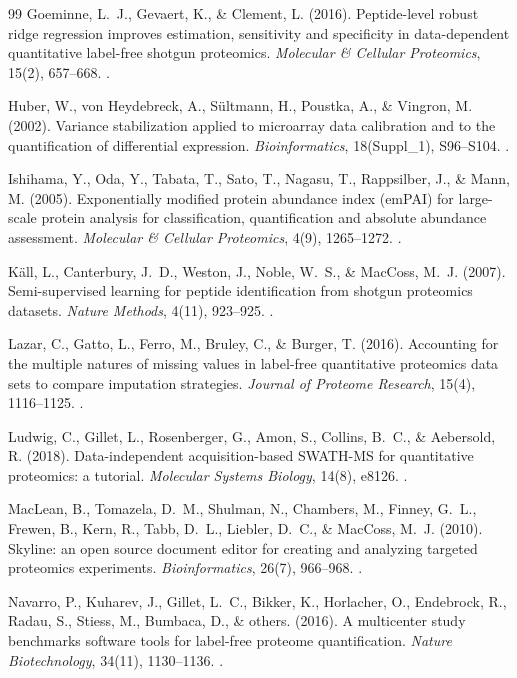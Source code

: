\documentclass[11pt,oneside]{book}
\begin{document}
\begin{thebibliography}{99}
Goeminne, L.~J., Gevaert, K., \& Clement, L. (2016). Peptide-level robust ridge regression improves estimation, sensitivity and specificity in data-dependent quantitative label-free shotgun proteomics. \textit{Molecular \& Cellular Proteomics}, 15(2), 657--668. .

Huber, W., von Heydebreck, A., S{\"u}ltmann, H., Poustka, A., \& Vingron, M. (2002). Variance stabilization applied to microarray data calibration and to the quantification of differential expression. \textit{Bioinformatics}, 18(Suppl\_1), S96--S104. .

Ishihama, Y., Oda, Y., Tabata, T., Sato, T., Nagasu, T., Rappsilber, J., \& Mann, M. (2005). Exponentially modified protein abundance index (emPAI) for large-scale protein analysis for classification, quantification and absolute abundance assessment. \textit{Molecular \& Cellular Proteomics}, 4(9), 1265--1272. .

K{\"a}ll, L., Canterbury, J.~D., Weston, J., Noble, W.~S., \& MacCoss, M.~J. (2007). Semi-supervised learning for peptide identification from shotgun proteomics datasets. \textit{Nature Methods}, 4(11), 923--925. .

Lazar, C., Gatto, L., Ferro, M., Bruley, C., \& Burger, T. (2016). Accounting for the multiple natures of missing values in label-free quantitative proteomics data sets to compare imputation strategies. \textit{Journal of Proteome Research}, 15(4), 1116--1125. .

Ludwig, C., Gillet, L., Rosenberger, G., Amon, S., Collins, B.~C., \& Aebersold, R. (2018). Data-independent acquisition-based SWATH-MS for quantitative proteomics: a tutorial. \textit{Molecular Systems Biology}, 14(8), e8126. .

MacLean, B., Tomazela, D.~M., Shulman, N., Chambers, M., Finney, G.~L., Frewen, B., Kern, R., Tabb, D.~L., Liebler, D.~C., \& MacCoss, M.~J. (2010). Skyline: an open source document editor for creating and analyzing targeted proteomics experiments. \textit{Bioinformatics}, 26(7), 966--968. .

Navarro, P., Kuharev, J., Gillet, L.~C., Bikker, K., Horlacher, O., Endebrock, R., Radau, S., Stiess, M., Bumbaca, D., \& others. (2016). A multicenter study benchmarks software tools for label-free proteome quantification. \textit{Nature Biotechnology}, 34(11), 1130--1136. .


\end{thebibliography}
\end{document}
